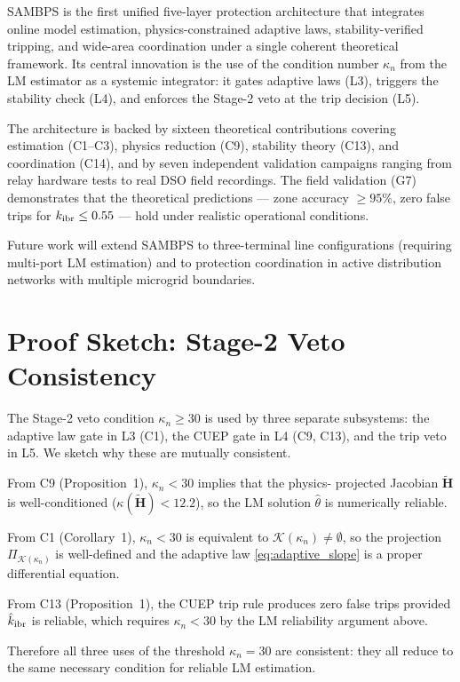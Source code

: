\documentclass[journal,twoside,10pt]{IEEEtran}
\newcommand{\kappan}{\kappa_{n}}
\newcommand{\kibr}{k_{\rm ibr}}
\newcommand{\calK}{\mathcal{K}}
\newcommand{\hattheta}{\hat{\theta}}
\newcommand{\hatkibr}{\hat{k}_{\rm ibr}}
\newcommand{\Proj}[1]{\Pi_{#1}}
\newcommand{\bfH}{\mathbf{H}}
\begin{document}
SAMBPS is the first unified five-layer protection architecture that
integrates online model estimation, physics-constrained adaptive laws,
stability-verified tripping, and wide-area coordination under a single
coherent theoretical framework.  Its central innovation is the use of
the condition number $\kappan$ from the LM estimator as a systemic
integrator: it gates adaptive laws (L3), triggers the stability check
(L4), and enforces the Stage-2 veto at the trip decision (L5).

The architecture is backed by sixteen theoretical contributions
covering estimation (C1--C3), physics reduction (C9), stability
theory (C13), and coordination (C14), and by seven independent
validation campaigns ranging from relay hardware tests to real DSO
field recordings.  The field validation (G7) demonstrates that the
theoretical predictions --- zone accuracy $\geq 95\%$, zero false
trips for $\kibr \leq 0.55$ --- hold under realistic operational
conditions.

Future work will extend SAMBPS to three-terminal line configurations
(requiring multi-port LM estimation) and to protection coordination
in active distribution networks with multiple microgrid boundaries.

\appendix
\section{Proof Sketch: Stage-2 Veto Consistency}
\label{app:veto}

The Stage-2 veto condition $\kappan \geq 30$ is used by three
separate subsystems: the adaptive law gate in L3 (C1), the CUEP
gate in L4 (C9, C13), and the trip veto in L5.  We sketch why
these are mutually consistent.

From C9 (Proposition~1), $\kappan < 30$ implies that the physics-
projected Jacobian $\tilde{\bfH}$ is well-conditioned
($\kappa(\tilde{\bfH}) < 12.2$), so the LM solution $\hattheta$ is
numerically reliable.

From C1 (Corollary~1), $\kappan < 30$ is equivalent to
$\calK(\kappan) \neq \emptyset$, so the projection
$\Proj{\calK(\kappan)}$ is well-defined and the adaptive law
\eqref{eq:adaptive_slope} is a proper differential equation.

From C13 (Proposition~1), the CUEP trip rule produces zero false
trips provided $\hatkibr$ is reliable, which requires $\kappan < 30$
by the LM reliability argument above.

Therefore all three uses of the threshold $\kappan = 30$ are
consistent: they all reduce to the same necessary condition for
reliable LM estimation. \hfill\IEEEQED



\end{document}
